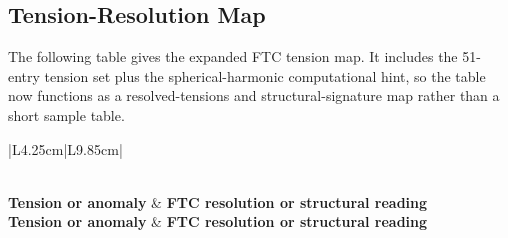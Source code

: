 \documentclass[11pt,a4paper]{article}
\begin{document}
\subsection{Tension-Resolution Map}
\label{sec:updated_tension_map}

The following table gives the expanded FTC tension map. It includes the 51-entry tension set plus the spherical-harmonic computational hint, so the table now functions as a resolved-tensions and structural-signature map rather than a short sample table.

\begin{center}
\small
\renewcommand{\arraystretch}{1.24}
\begin{longtable}{|L{4.25cm}|L{9.85cm}|}
\caption{Expanded tensions and structural signatures under the completed FTC ontology.}
\label{tab:resolved_tensions_ftc}\\
\hline
\textbf{Tension or anomaly} & \textbf{FTC resolution or structural reading} \\
\hline
\endfirsthead
\hline
\textbf{Tension or anomaly} & \textbf{FTC resolution or structural reading} \\
\hline
\endhead
\hline
{}\\
\hline
\endfoot
\hline
\endlastfoot


\end{longtable}
\end{center}
\end{document}
